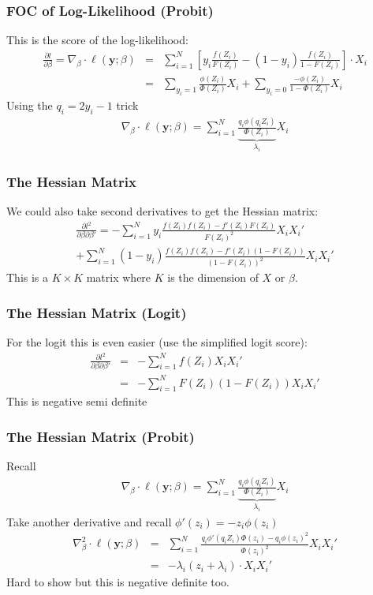 \begin{frame}
\frametitle{FOC of Log-Likelihood (Probit)}
This is the \alert{score} of the log-likelihood:
\begin{eqnarray*}
\frac{\partial l }{\partial \beta} = \nabla_{\beta} \cdot \ell(\mathbf{y}; \beta) &=&  \sum_{i=1}^N  \left[ y_i \frac{ f(Z_i) }{ F(Z_i)}  -  (1-y_i) \frac{f(Z_i) }{1-F(Z_i)} \right] \cdot X_i  \\
 &=&  \sum_{y_i=1}  \frac{\phi(Z_i) }{ \Phi(Z_i)} X_i +\sum_{y_i=0} \frac{-\phi(Z_i) }{1-\Phi(Z_i)} X_i
\end{eqnarray*}
Using the $q_i = 2 y_i -1$ trick
\begin{eqnarray*}
\nabla_{\beta} \cdot \ell(\mathbf{y}; \beta)= \sum_{i=1}^N \underbrace{\frac{ q_i \phi(q_i Z_i)}{\Phi(Z_i)}}_{\lambda_i} X_i
\end{eqnarray*}
\end{frame}


\begin{frame}
\frametitle{The Hessian Matrix}
We could also take second derivatives to get the \alert{Hessian} matrix:
\begin{eqnarray*}
\frac{\partial l^2 }{\partial \beta \partial \beta'} = - \sum_{i=1}^N   y_i \frac{ f(Z_i)  f(Z_i) - f'(Z_i) F(Z_i) }{ F(Z_i)^2}  X_i X_i' \\
+  \sum_{i=1}^N   (1-y_i) \frac{f(Z_i)f(Z_i) - f'(Z_i)(1-F(Z_i))}{(1-F(Z_i))^2}  X_i X_i'
\end{eqnarray*}
This is a $K\times K$ matrix where $K$ is the dimension of $X$ or $\beta$.
\end{frame}



\begin{frame}
\frametitle{The Hessian Matrix (Logit)}
For the logit this is even easier (use the simplified logit score):
\begin{eqnarray*}
\frac{\partial l^2 }{\partial \beta \partial \beta'}  &=& - \sum_{i=1}^N f(Z_i) X_i X_i' \\
&=& - \sum_{i=1}^N F(Z_i) (1- F(Z_i)) X_i X_i'
\end{eqnarray*}
This is \alert{negative semi definite}
\end{frame}

\begin{frame}
\frametitle{The Hessian Matrix (Probit)}
Recall
\begin{eqnarray*}
\nabla_{\beta} \cdot \ell(\mathbf{y}; \beta)= \sum_{i=1}^N \underbrace{\frac{ q_i \phi(q_i Z_i)}{\Phi(Z_i)}}_{\lambda_i} X_i
\end{eqnarray*}
Take another derivative and recall $\phi'(z_i) = - z_i \phi(z_i)$
\begin{eqnarray*}
\nabla_{\beta}^2 \cdot \ell(\mathbf{y}; \beta)&=& \sum_{i=1}^N \frac{q_i \phi'(q_i Z_i) \Phi(z_i) - q_i \phi(z_i)^2}{\Phi(z_i)^2}  X_i X_i' \\
&=& - \lambda_i( z_i + \lambda_i) \cdot X_i X_i'
\end{eqnarray*}
Hard to show but this is \alert{negative definite} too.
\end{frame}


